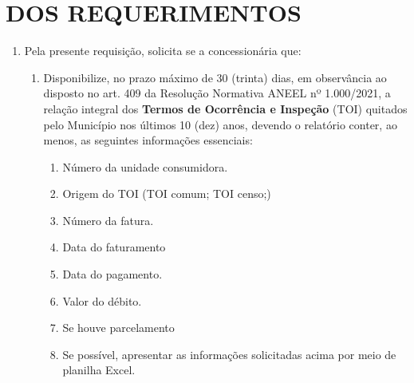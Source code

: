 \documentclass[11pt,a4paper]{article}
\begin{document}


\section{DOS REQUERIMENTOS}

\begin{enumerate}[resume]
\item Pela presente requisição, solicita se a concessionária que:
\begin{enumerate}
  \item Disponibilize, no prazo máximo de 30 (trinta) dias, em observância ao disposto no art. 409 da Resolução Normativa ANEEL nº 1.000/2021, a relação integral dos \textbf{Termos de Ocorrência e Inspeção} (TOI) quitados pelo Município nos últimos 10 (dez) anos, devendo o relatório conter, ao menos, as seguintes informações essenciais:
  \begin{enumerate}
    \item Número da unidade consumidora.
    \item Origem do TOI (TOI comum; TOI censo;)
    \item Número da fatura.
    \item Data do faturamento
    \item Data do pagamento.
    \item Valor do débito.
    \item Se houve parcelamento 
    \item Se possível, apresentar as informações solicitadas acima por meio de planilha Excel.
  \end{enumerate}
  \end{enumerate}
\end{enumerate}
\end{document}
